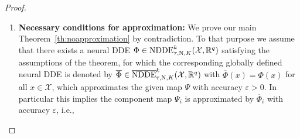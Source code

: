 \documentclass[10pt]{article}
\numberwithin{equation}{section}
\newcommand{\eps}{\varepsilon}
\newcommand\norm[1]{\left\lVert#1\right\rVert}
\begin{document}
\begin{proof}
\begin{enumerate}
			\begin{equation} \label{eq:ass_beta_tau}
				0<\kappa \leq r_1, \quad \beta=\beta_\kappa \coloneqq \ln\left(\frac{2C_2}{\kappa}\right)\geq 0 \quad \text{and} \quad 0\leq \tau< \min\left\{\tau_{1,\beta,\kappa},\frac{1}{Ke},\frac{T}{\beta}\right\}.
			\end{equation}
			Hereby $\beta_\kappa$ depends on $\kappa$ and the previously defined constant $C_2$ with $2C_2 \geq r_1 \geq \kappa>0$ and $\tau_{1,\beta,\kappa}=\frac{\kappa}{2C_1 \beta}>0$ is the upper bound of Lemma \ref{lem:mapG} necessary for the estimates \eqref{eq:Glemma}, \eqref{eq:GlambdaP}. The upper bound $\frac{1}{Ke}$ is necessary for the exponential estimates \eqref{eq:Gestimate} and \eqref{eq:Hestimate} and the upper bound $\frac{T}{\beta}$ guarantees that $t^\ast = \beta \tau <T$. 
			Then it follows from \eqref{eq:Glemma} and \eqref{eq:Gestimate} that
			\begin{equation} \label{eq:Gdistance}
				\norm{\overline{G}(\bar{y}_1)-y_1}_\infty \leq \norm{\overline{G}(\bar{y}_1)-G(y_1)}_\infty + \norm{G(y_1)-y_1}_\infty \leq \delta_{1,t^\ast}+\delta_{2,\beta} < \kappa,
			\end{equation}
			as
			\begin{equation*}
				\delta_{1,t^\ast}+\delta_{2,\beta} = C_1 \beta \tau + C_2 e^{-\beta} < C_1 \beta \tau_{1,\beta,\kappa} + C_2 e^{-\beta_\kappa} = \frac{\kappa}{2} + \frac{\kappa}{2} = \kappa.
			\end{equation*}
			Especially for $\lambda(p)\in \mathcal{K}_1$ of \eqref{eq:GlambdaP} it follows
			that there exists a point $\overline{\lambda(p)}\in\mathbb{R}^m$ specifying the corresponding special solution $S(y(0,c_{\lambda(p)})) = \bar{y}\big(0,\overline{\lambda(p)}\big)$, such that 
			\begin{equation} \label{eq:Gbarlambdap}
				\overline{G}\big(\overline{\lambda(p)}\big) \in B_{\delta_{1,t^\ast}+\delta_{2,\beta}}(\lambda(p)) \subset K_{\kappa}(\lambda(p))\subset K_{r_1}(\lambda(p))\subset \mathcal{K}_{1},
			\end{equation}
			as by Lemma \ref{lem:initial_behavior} it holds $K_{r_1}(\lambda(p))\subset \mathcal{K}_{1}$. 
			\item  \textbf{Necessary conditions for approximation:} We prove our main Theorem~\ref{th:noapproximation} by contradiction. To that purpose we assume that there exists a neural DDE $\Phi\in \textup{NDDE}^k_{\tau,\text{N},K}(\mathcal{X},\mathbb{R}^q)$ satisfying the assumptions of the theorem, for which the corresponding globally defined neural DDE is denoted by $\overline{\Phi}\in \overline{\textup{NDDE}}^k_{\tau,\text{N},K}(\mathcal{X},\mathbb{R}^q)$ with $\overline{\Phi}(x) = \Phi(x)$ for all $x \in \mathcal{X}$, which approximates the given map $\Psi$ with accuracy $\eps>0$. In particular this implies the component map $\Psi_i$ is approximated by $\overline{\Phi}_i$ with accuracy $\eps$, i.e.,

\end{enumerate}
\end{proof}
\end{document}
